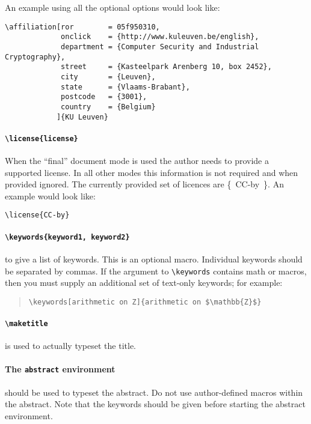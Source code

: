 \documentclass{iacrcc}
\begin{document}
\noindent An example using all the optional options would look like:

\begin{verbatim}
\affiliation[ror        = 05f950310,
             onclick    = {http://www.kuleuven.be/english},
             department = {Computer Security and Industrial Cryptography},              
             street     = {Kasteelpark Arenberg 10, box 2452},
             city       = {Leuven},
             state      = {Vlaams-Brabant},
             postcode   = {3001},
             country    = {Belgium}
            ]{KU Leuven}
\end{verbatim}           

\paragraph{\texttt{\textbackslash license\{license\}}}
When the ``final'' document mode is used the author needs to provide a supported license.
In all other modes this information is not required and when provided ignored.
The currently provided set of licences are \mbox{\{ CC-by \}}.
An example would look like:

\begin{verbatim}
\license{CC-by}
\end{verbatim}

\paragraph{\texttt{\textbackslash keywords\{keyword1, keyword2\}}} to give a list of
keywords. This is an optional macro.  Individual keywords should be
separated by commas. If the argument to \texttt{\textbackslash keywords}
contains math or macros, then you must supply an additional set of
text-only keywords; for example:
\begin{quotation}
\texttt{\textbackslash keywords[arithmetic on Z]\{arithmetic on \$\textbackslash mathbb\{Z\}\$\}}
\end{quotation}

\paragraph{\texttt{\textbackslash maketitle}} is used to actually
typeset the title.

\paragraph{The \texttt{abstract} environment} should be used to typeset the abstract.
Do not use author-defined macros within the abstract.  Note that the
keywords should be given before starting the abstract environment.
\end{document}
